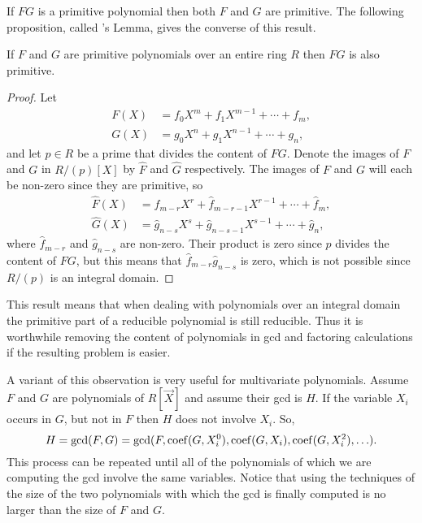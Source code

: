 If $FG$ is a primitive polynomial then both $F$ and $G$ are
primitive.
The following proposition, called {\Gauss}'s Lemma, gives the converse of this result.

\begin{proposition}[Gauss] \label{Gauss:Lemma:Prop}
If $F$ and $G$ are primitive polynomials over an entire ring $R$ then
$FG$ is also primitive.
\end{proposition}

\begin{proof}
Let 
\[
\begin{aligned}
F(X) &= f_0 X^m + f_{1} X^{m-1} + \cdots + f_m,\\
G(X) &= g_0 X^n + g_{1} X^{n-1} + \cdots + g_n,
\end{aligned}
\]
and let $p \in R$ be a prime that divides the content of $FG$.  Denote the
images of $F$ and $G$ in $R/(p)[X]$ by $\hat F$ and $\hat G$ respectively.  The
images of $F$ and $G$ will each be non-zero since they are primitive, so 
\[
\begin{aligned}
\hat F(X) &= \hat f_{m-r} X^r + \hat f_{m-r-1} X^{r-1} + \cdots + \hat f_m,\\
\hat G(X) &= \hat g_{n-s} X^s + \hat g_{n-s-1} X^{s-1} + \cdots + \hat g_n,
\end{aligned}
\]
where $\hat{f}_{m-r}$ and $\hat{g}_{n-s}$ are non-zero.  Their product is zero
since $p$ divides the content of $FG$, but this means that $\hat f_{m-r}
\hat g_{n-s}$ is zero, which is not possible since $R/(p)$ is an integral
domain.
\end{proof}

\noindent
This result means that when dealing with polynomials over an integral
domain the primitive part of a
reducible polynomial is still reducible.  Thus it is worthwhile
removing the content of polynomials in {\sc gcd} and factoring
calculations if the resulting problem is easier.

A variant of this observation is very useful for multivariate
polynomials.  Assume $F$ and $G$ are polynomials of $R[\vec{X}]$ and
assume their {\sc gcd} is $H$.  If the variable $X_i$ occurs in $G$,
but not in $F$ then $H$ does not involve $X_i$.  So,
\[
H = \gcd(F, G) = \gcd(F, \mathop{\rm coef}\nolimits(G, X_i^0), \mathop{\rm coef}\nolimits(G, X_i), \mathop{\rm coef}\nolimits(G,
X_i^2), \ldots).
\]
This process can be repeated until all of the polynomials of which we
are computing the {\sc gcd} involve the same variables.  Notice that
using the techniques of  the size of the two
polynomials with which the {\sc gcd} is finally computed is no larger
than the size of $F$ and $G$.

